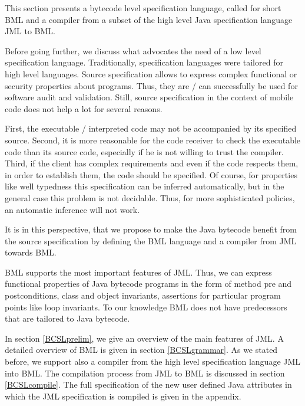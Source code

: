 
%

\newcommand{\code}{\textit{code}}
\newcommand{\indexComp}{\textit{index}}





This section presents a bytecode level specification language, called for short BML and a compiler from a
 subset of the high level Java specification language JML to BML. 


 Before going further, we discuss what advocates the need of a low level specification language.
Traditionally, specification languages were tailored for high level languages.  
Source  specification allows to express complex functional or security properties about programs.
Thus, they are / can successfully be used 
for software audit and validation. Still, source specification in the context of mobile code does not help a lot for several reasons.


First, the executable / interpreted code  may not be accompanied by its specified  source. Second, it is more reasonable for the 
code receiver to check the executable code than its source code, especially if he is not willing to trust the compiler. 
Third, if the client has complex requirements and even if the code respects them, in order to establish them, 
the code should be specified. Of course, for properties like well typedness this specification can be inferred automatically,
but in the general case this problem is not decidable. 
Thus, for more sophisticated policies, an automatic inference will not work.

 It is in this perspective, that we propose to make the Java
bytecode benefit from the source specification by defining the BML language and a compiler from JML towards BML.    

 BML supports the most important features of JML. Thus, we can express functional properties of Java
 bytecode programs in the form of method pre and postconditions, class and object invariants, assertions
 for particular program points like loop invariants. To our knowledge BML does not have predecessors that are tailored 
 to Java bytecode.  

 In section \ref{BCSLprelim}, we give an overview of the main features of JML. A detailed overview of BML is given in section \ref{BCSLgrammar}.  
  As we stated before, we support also a compiler from the high level specification language JML into BML. The 
 compilation process from JML to BML is discussed in section  \ref{BCSLcompile}.
 The full specification of the new user defined Java attributes in which the JML specification is compiled is given in the appendix.





